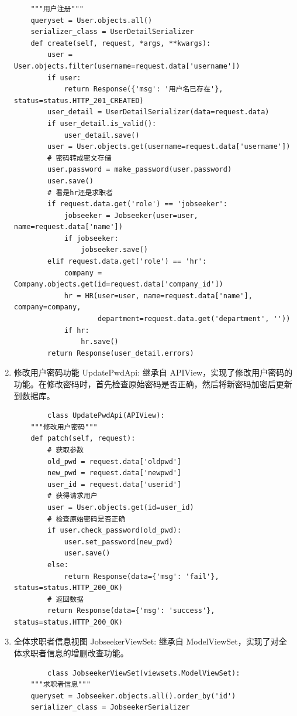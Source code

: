 \documentclass[UTF8,a4paper,10pt]{ctexart}
\begin{document}
\begin{enumerate}
\begin{lstlisting}
    """用户注册"""
    queryset = User.objects.all()
    serializer_class = UserDetailSerializer
    def create(self, request, *args, **kwargs):
        user = User.objects.filter(username=request.data['username'])
        if user:
            return Response({'msg': '用户名已存在'}, status=status.HTTP_201_CREATED)
        user_detail = UserDetailSerializer(data=request.data)
        if user_detail.is_valid():
            user_detail.save()
        user = User.objects.get(username=request.data['username'])
        # 密码转成密文存储
        user.password = make_password(user.password)
        user.save()
        # 看是hr还是求职者
        if request.data.get('role') == 'jobseeker':
            jobseeker = Jobseeker(user=user, name=request.data['name'])
            if jobseeker:
                jobseeker.save()
        elif request.data.get('role') == 'hr':
            company = Company.objects.get(id=request.data['company_id'])
            hr = HR(user=user, name=request.data['name'], company=company,
                    department=request.data.get('department', ''))
            if hr:
                hr.save()
        return Response(user_detail.errors)
    \end{lstlisting}
    \item 修改用户密码功能 UpdatePwdApi: 继承自 APIView，实现了修改用户密码的功能。在修改密码时，首先检查原始密码是否正确，然后将新密码加密后更新到数据库。
    \begin{lstlisting}
        class UpdatePwdApi(APIView):
    """修改用户密码"""
    def patch(self, request):
        # 获取参数
        old_pwd = request.data['oldpwd']
        new_pwd = request.data['newpwd']
        user_id = request.data['userid']
        # 获得请求用户
        user = User.objects.get(id=user_id)
        # 检查原始密码是否正确
        if user.check_password(old_pwd):
            user.set_password(new_pwd)
            user.save()
        else:
            return Response(data={'msg': 'fail'}, status=status.HTTP_200_OK)
        # 返回数据
        return Response(data={'msg': 'success'}, status=status.HTTP_200_OK)
    \end{lstlisting}
    \item 全体求职者信息视图 JobseekerViewSet: 继承自 ModelViewSet，实现了对全体求职者信息的增删改查功能。
    \begin{lstlisting}
        class JobseekerViewSet(viewsets.ModelViewSet):
    """求职者信息"""
    queryset = Jobseeker.objects.all().order_by('id')
    serializer_class = JobseekerSerializer
    \end{lstlisting}

\end{enumerate}
\end{document}
